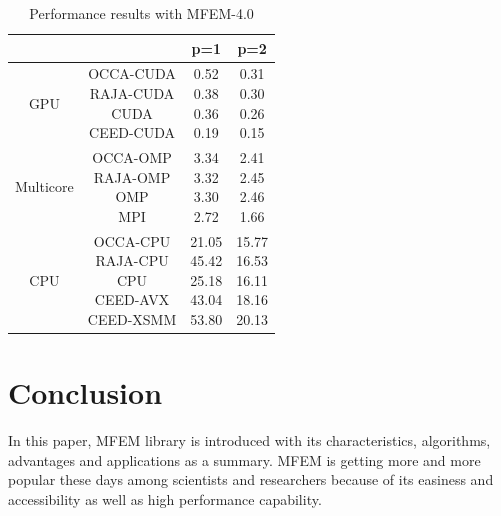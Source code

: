 \documentclass{article}
\begin{document}
\begin{table}[hbt!]
    \begin{center}
    \begin{tabular}{ ||c c c c|| } 
         \hline
          &  & p=1 & p=2  \\
         \hline\hline
         GPU & \thead{OCCA-CUDA\\ RAJA-CUDA\\ CUDA\\ CEED-CUDA} & \thead{0.52 \\ 0.38 \\ 0.36 \\ 0.19} & \thead{0.31\\ 0.30\\ 0.26\\ 0.15} \\ 
         \hline
         Multicore & \thead{OCCA-OMP\\ RAJA-OMP\\ OMP\\ MPI} & \thead{3.34 \\ 3.32 \\ 3.30 \\ 2.72} & \thead{2.41 \\ 2.45 \\ 2.46 \\ 1.66}\\ 
         \hline
         CPU & \thead{OCCA-CPU\\ RAJA-CPU\\ CPU\\ CEED-AVX\\ CEED-XSMM} & \thead{21.05\\ 45.42\\ 25.18\\ 43.04\\ 53.80} & \thead{15.77\\ 16.53\\ 16.11\\ 18.16\\ 20.13} \\ 
         \hline
     \end{tabular}
    \caption{Performance results with MFEM-4.0}
    \label{table_1}
    \end{center}
\end{table}
\FloatBarrier
\section{Conclusion}
In this paper, MFEM library is introduced with its characteristics, algorithms, advantages and applications as a summary. MFEM is getting more and more popular these days among scientists and researchers because of its easiness and accessibility as well as high performance capability. 
\printbibliography
\end{document}
